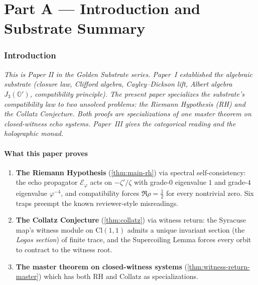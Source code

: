\documentclass[11pt,a4paper]{article}
\theoremstyle{plain}
\theoremstyle{definition}
\theoremstyle{remark}
\numberwithin{equation}{section}
\providecommand{\Cl}{\mathrm{Cl}}
\providecommand{\Os}{\mathbb{O}'}
\providecommand{\vp}{\varphi}
\providecommand{\half}{\tfrac{1}{2}}
\providecommand{\EF}{\mathcal{E}}
\newenvironment{sectionopener}
  {\begin{sectionopenerframe}\small\itshape\ignorespaces}
  {\end{sectionopenerframe}}
\begin{document}
\part*{Part A --- Introduction and Substrate Summary}

\section{Introduction}
\label{sec:intro}

\begin{sectionopener}
This is Paper II in the Golden Substrate series.  Paper~I established the
algebraic substrate (closure law, Clifford algebra, Cayley--Dickson
lift, Albert algebra $J_3(\Os)$, compatibility principle).  The
present paper specializes the substrate's compatibility law to two
unsolved problems: the Riemann Hypothesis (RH) and the Collatz
Conjecture.  Both proofs are specializations of one master
theorem on closed-witness echo systems.  Paper~III gives the
categorical reading and the holographic monad.
\end{sectionopener}

\subsection*{What this paper proves}

\begin{enumerate}[label=(\textbf{T\arabic*})]
\item \textbf{The Riemann Hypothesis} (\cref{thm:main-rh}) via
  spectral self-consistency: the echo propagator $\EF_\vp$ acts on
  $-\zeta'/\zeta$ with grade-$0$ eigenvalue $1$ and grade-$4$
  eigenvalue $\vp^{-4}$, and compatibility forces $\Re\rho =
  \half$ for every nontrivial zero.  Six traps preempt the known
  reviewer-style misreadings.

\item \textbf{The Collatz Conjecture} (\cref{thm:collatz}) via
  witness return: the Syracuse map's witness module on $\Cl(1,1)$
  admits a unique invariant section (the \emph{Logos section}) of
  finite trace, and the Supercoiling Lemma forces every orbit to
  contract to the witness root.

\item \textbf{The master theorem on closed-witness systems}
  (\cref{thm:witness-return-master}) which has both RH and Collatz
  as specializations.
\end{enumerate}
\end{document}
